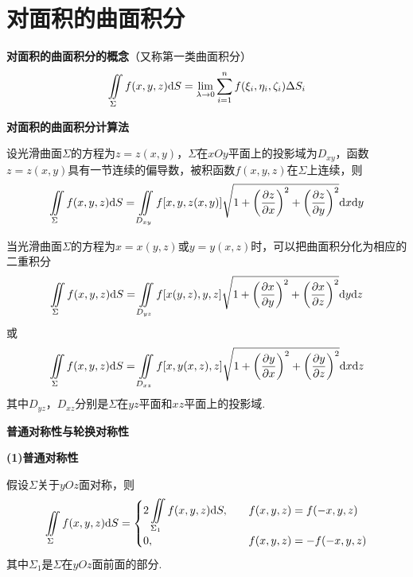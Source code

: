\section{对面积的曲面积分}

\textbf{对面积的曲面积分的概念}（又称第一类曲面积分）
\begin{equation*}
    \iint \limits_{\Sigma}f(x,y,z)\mathrm{d} S=\lim_{\lambda\rightarrow 0}\sum_{i=1}^{n}f(\xi_i,\eta_i,\zeta_i)\Delta S_i
\end{equation*}

\textbf{对面积的曲面积分计算法}

设光滑曲面$\Sigma$的方程为$z=z(x,y)$，$\Sigma$在$xOy$平面上的投影域为$D_{xy}$，函数$z=z(x,y)$具有一节连续的偏导数，被积函数$f(x,y,z)$在$\Sigma$上连续，则
\begin{equation*}
    \iint \limits_{\Sigma}f(x,y,z)\mathrm{d} S=\iint \limits_{D_{xy}}f[x,y,z(x,y)]\sqrt{1+\left(\frac{\partial z}{\partial x}\right)^{2}+\left(\frac{\partial z}{\partial y}\right)^{2}}\mathrm{d} x\mathrm{d} y
\end{equation*}

当光滑曲面$\Sigma$的方程为$x=x(y,z)$或$y=y(x,z)$时，可以把曲面积分化为相应的二重积分
\begin{equation*}
    \iint \limits_{\Sigma}f(x,y,z)\mathrm{d} S=\iint \limits_{D_{yz}}f[x(y,z),y,z]\sqrt{1+\left(\frac{\partial x}{\partial y}\right)^{2}+\left(\frac{\partial x}{\partial z}\right)^{2}}\mathrm{d} y\mathrm{d} z
\end{equation*}
或
\begin{equation*}
    \iint \limits_{\Sigma}f(x,y,z)\mathrm{d} S=\iint \limits_{D_{xz}}f[x,y(x,z),z]\sqrt{1+\left(\frac{\partial y}{\partial x}\right)^{2}+\left(\frac{\partial y}{\partial z}\right)^{2}}\mathrm{d} x\mathrm{d} z
\end{equation*}
其中$D_{yz}$，$D_{xz}$分别是$\Sigma$在$yz$平面和$xz$平面上的投影域.

\textbf{普通对称性与轮换对称性}

\textbf{(1)普通对称性}

假设$\Sigma$关于$yOz$面对称，则
\begin{equation*}
    \iint\limits_{\Sigma}f(x,y,z)\mathrm{d} S=
    \begin{cases}
        2\displaystyle\iint\limits_{\Sigma_1}f(x,y,z)\mathrm{d} S, \quad & f(x,y,z)=f(-x,y,z) \\
        0, \quad & f(x,y,z)=-f(-x,y,z)
    \end{cases}
\end{equation*}
其中$\Sigma_1$是$\Sigma$在$yOz$面前面的部分.

